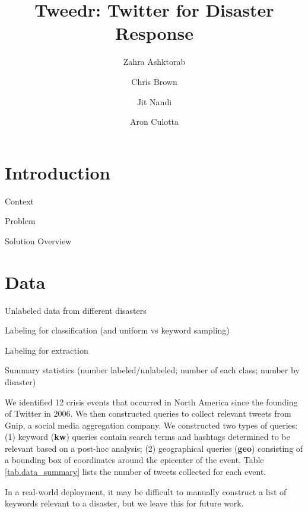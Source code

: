 \documentclass{article}
\title{Tweedr: Twitter for Disaster Response}
\author{Zahra Ashktorab \and Chris Brown \and Jit Nandi \and Aron Culotta}
\begin{document}
\maketitle

\section{Introduction}

\begin{outline}
  \item Context
  \item Problem
  \item Solution Overview
\end{outline}



\section{Data}
\begin{outline}
  \item Unlabeled data from different disasters
  \item Labeling for classification (and uniform vs keyword sampling)
  \item Labeling for extraction
  \item Summary statistics (number labeled/unlabeled; number of each class; number by disaster)
\end{outline}

We identified 12 crisis events that occurred in North America since the
founding of Twitter in 2006. We then constructed queries to collect relevant
tweets from Gnip, a social media aggregation company. We constructed two types
of queries: (1) keyword ({\bf kw}) queries contain search terms and hashtags
determined to be relevant based on a post-hoc analysis; (2) geographical
queries ({\bf geo}) consisting of a bounding box of coordinates around the
epicenter of the event. Table \ref{tab.data_summary} lists the number of
tweets collected for each event.

In a real-world deployment, it may be difficult to manually construct a list
of keywords relevant to a disaster, but we leave this for future work.
\end{document}
